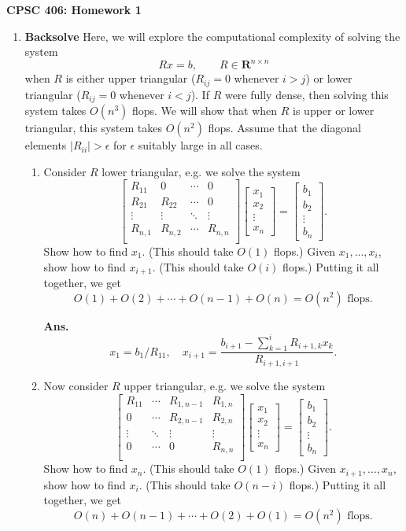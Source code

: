 \documentclass{article}
\newcommand{\showsolution}[1]{\textbf{Ans.}\;#1}
\renewcommand{\Re}{\mathbf R}
\newcommand{\bmat}{\left[\begin{matrix}}
\newcommand{\emat}{\end{matrix}\right]}
\begin{document}
	{\Large\textbf{CPSC 406: Homework 1}}



\begin{enumerate}
	
	\item \textbf{Backsolve} Here, we will explore the computational complexity of solving the system 
	\[
	Rx = b, \qquad R\in \Re^{n\times n}
	\]
	when $R$ is either upper triangular ($R_{ij} = 0$ whenever $i > j$) or lower triangular ($R_{ij} = 0$ whenever $i < j$). If $R$ were fully dense, then solving this system takes $O(n^3)$ flops. We will show that when $R$ is upper or lower triangular, this system takes $O(n^2)$ flops. Assume that the diagonal elements $|R_{ii}| > \epsilon$ for $\epsilon$ suitably large in all cases.


	\begin{enumerate}
		\item Consider $R$ lower triangular, e.g. we solve the system
		\[
		\bmat 
		R_{11} & 0 & \cdots & 0 \\
		R_{21} & R_{22} & \cdots & 0 \\
		\vdots  & \vdots  & \ddots & \vdots  \\
		R_{n,1} & R_{n,2} & \cdots & R_{n,n}\\
		\emat 
		\bmat x_1 \\ x_2 \\ \vdots \\ x_n \emat 
		=
		\bmat b_1 \\ b_2 \\ \vdots \\ b_n \emat. 
		\]
		Show how to find $x_1$. (This should take $O(1)$ flops.)  Given $x_1,...,x_i$, show how to find $x_{i+1}$. (This should take $O(i)$ flops.) Putting it all together, we get 
		\[
		O(1) + O(2) + \cdots + O(n-1) + O(n) = O(n^2) \text{ flops.}
		\]
		
		\showsolution{
		\[
		x_1 = b_1/R_{11}, \quad x_{i+1} = \frac{b_{i+1} - \sum_{k=1}^i R_{i+1,k}x_k}{R_{i+1,i+1}}.
		\]	
		}
		\item Now consider $R$ upper triangular, e.g. we solve the system
		\[
		\bmat 
		R_{11} &  \cdots & R_{1,n-1} &R_{1,n} \\
		 0     &  \cdots & R_{2,n-1} &R_{2,n} \\
		\vdots  & \ddots    &  \vdots &\vdots  \\
		0 &  \cdots & 0 &R_{n,n}\\
		\emat 
		\bmat x_1 \\ x_2 \\ \vdots \\ x_n \emat 
		=
		\bmat b_1 \\ b_2 \\ \vdots \\ b_n \emat. 
		\]
		Show how to find $x_n$. (This should take $O(1)$ flops.)  Given $x_{i+1},...,x_n$, show how to find $x_{i}$. (This should take $O(n-i)$ flops.) Putting it all together, we get 
		\[
		O(n) + O(n-1) + \cdots + O(2) + O(1) = O(n^2) \text{ flops.}
		\]
		

\end{enumerate}
\end{enumerate}
\end{document}
